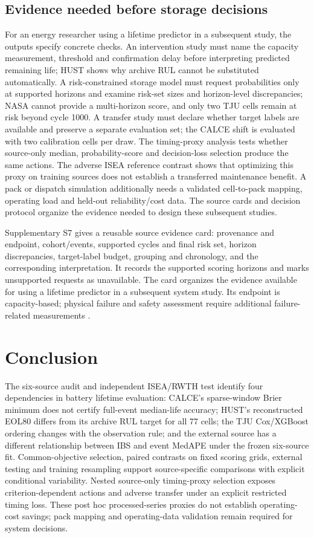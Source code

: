 \documentclass[preprint,12pt]{elsarticle}
\begin{document}
\subsection{Evidence needed before storage decisions}
For an energy researcher using a lifetime predictor in a subsequent study, the outputs specify concrete checks. An intervention study must name the capacity measurement, threshold and confirmation delay before interpreting predicted remaining life; HUST shows why archive RUL cannot be substituted automatically. A risk-constrained storage model must request probabilities only at supported horizons and examine risk-set sizes and horizon-level discrepancies; NASA cannot provide a multi-horizon score, and only two TJU cells remain at risk beyond cycle 1000. A transfer study must declare whether target labels are available and preserve a separate evaluation set; the CALCE shift is evaluated with two calibration cells per draw. The timing-proxy analysis tests whether source-only median, probability-score and decision-loss selection produce the same actions. The adverse ISEA reference contrast shows that optimizing this proxy on training sources does not establish a transferred maintenance benefit. A pack or dispatch simulation additionally needs a validated cell-to-pack mapping, operating load and held-out reliability/cost data. The source cards and decision protocol organize the evidence needed to design these subsequent studies.

Supplementary S7 gives a reusable source evidence card: provenance and endpoint, cohort/events, supported cycles and final risk set, horizon discrepancies, target-label budget, grouping and chronology, and the corresponding interpretation. It records the supported scoring horizons and marks unsupported requests as unavailable. The card organizes the evidence available for using a lifetime predictor in a subsequent system study. Its endpoint is capacity-based; physical failure and safety assessment require additional failure-related measurements \citep{attia2026}.

\section{Conclusion}
The six-source audit and independent ISEA/RWTH test identify four dependencies in battery lifetime evaluation: CALCE's sparse-window Brier minimum does not certify full-event median-life accuracy; HUST's reconstructed EOL80 differs from its archive RUL target for all 77 cells; the TJU Cox/XGBoost ordering changes with the observation rule; and the external source has a different relationship between IBS and event MedAPE under the frozen six-source fit. Common-objective selection, paired contrasts on fixed scoring grids, external testing and training resampling support source-specific comparisons with explicit conditional variability. Nested source-only timing-proxy selection exposes criterion-dependent actions and adverse transfer under an explicit restricted timing loss. These post hoc processed-series proxies do not establish operating-cost savings; pack mapping and operating-data validation remain required for system decisions.
\end{document}
